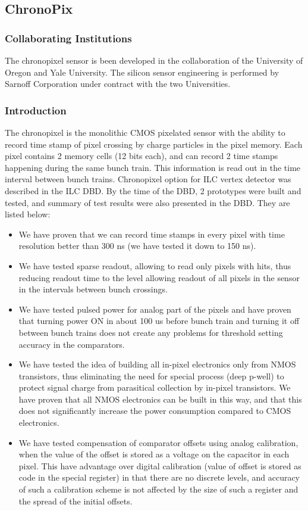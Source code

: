 \subsection{ChronoPix}
\subsubsection{Collaborating Institutions}
    The chronopixel sensor is been developed in the collaboration of the University of Oregon and Yale University. The silicon sensor engineering is performed by Sarnoff Corporation under contract with the two Universities.

\subsubsection{Introduction}
The chronopixel is the monolithic CMOS pixelated sensor with the ability to record time stamp of pixel crossing by charge particles in the pixel memory. Each pixel contains 2 memory cells (12 bits each), and can record 2 time stamps happening during the same bunch train. This information is read out in the time interval between bunch trains. Chronopixel option for ILC vertex detector was described in the ILC DBD. By the time of the DBD, 2 prototypes were built and tested, and summary of test results were also presented in the DBD. They are listed below: 
\begin{itemize}
    \item We have proven that we can record time stamps in every pixel with time resolution better than 300 ns (we have tested it down to 150 ns).
    \item We have tested sparse readout, allowing to read only pixels with hits, thus reducing readout time to the level allowing readout of all pixels in the sensor in the intervals between bunch crossings.
    \item We have tested pulsed power for analog part of the pixels and have proven that turning power ON in about 100 us before bunch train and turning it off between bunch trains does not create any problems for threshold setting accuracy in the comparators.
    \item We have tested the idea of building all in-pixel electronics only from NMOS transistors, thus eliminating the need for special process (deep p-well) to protect signal charge from parasitical collection by in-pixel transistors. We have proven that all NMOS electronics can be built in this way, and that this does not significantly increase the power consumption compared to CMOS electronics.
    \item We have tested compensation of comparator offsets using analog calibration, when the value of the offset is stored as a voltage on the capacitor in each pixel. This have advantage over digital calibration (value of offset is stored as code in the special register) in that there are no discrete levels, and accuracy of such a calibration scheme is not affected by the size of such a register and the spread of the initial offsets.
\end{itemize}
